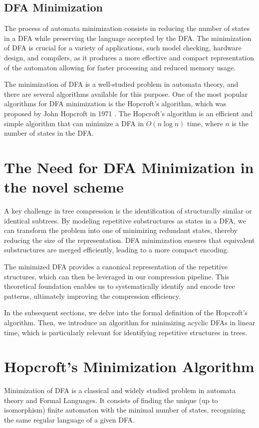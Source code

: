 \subsection{DFA Minimization}
The process of automata minimization consists in reducing the number of states in a DFA while preserving the language accepted by the DFA. The minimization of DFA is crucial for a variety of applications, such model checking, hardware design, and compilers, as it produces a more effective and compact representation of the automaton allowing for faster processing and reduced memory usage.

The minimization of DFA is a well-studied problem in automata theory, and there are several algorithms available for this purpose. One of the most popular algorithms for DFA minimization is the Hopcroft's algorithm, which was proposed by John Hopcroft in 1971 \cite{HOPCROFT1971189}. The Hopcroft's algorithm is an efficient and simple algorithm that can minimize a DFA in $O(n \log n)$ time, where $n$ is the number of states in the DFA.

\section{The Need for DFA Minimization in the novel scheme}
A key challenge in tree compression is the identification of structurally similar or identical subtrees. By modeling repetitive substructures as states in a DFA, we can transform the problem into one of minimizing redundant states, thereby reducing the size of the representation. DFA minimization ensures that equivalent substructures are merged efficiently, leading to a more compact encoding.

The minimized DFA provides a canonical representation of the repetitive structures, which can then be leveraged in our compression pipeline. This theoretical foundation enables us to systematically identify and encode tree patterns, ultimately improving the compression efficiency.

In the subsequent sections, we delve into the formal definition of the Hopcroft's algorithm. Then, we introduce an algorithm for minimizing acyclic DFAs in linear time, which is particularly relevant for identifying repetitive structures in trees. 

\section{Hopcroft's Minimization Algorithm}
Minimization of DFA is a classical and widely studied problem in automata theory and Formal Languages. It consists of finding the unique (up to isomorphism) finite automaton with the minimal number of states, recognizing the same regular language of a given DFA.

